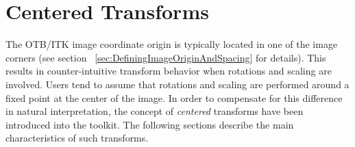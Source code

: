 

\section{ Centered Transforms }

The OTB/ITK image coordinate origin is typically located in one of the image
corners (see section ~\ref{sec:DefiningImageOriginAndSpacing} for details).
This results in counter-intuitive transform behavior when rotations and scaling
are involved. Users tend to assume that rotations and scaling are performed
around a fixed point at the center of the image.  In order to compensate for
this difference in natural interpretation, the concept of \emph{centered}
transforms have been introduced into the toolkit. The following sections
describe the main characteristics of such transforms.




